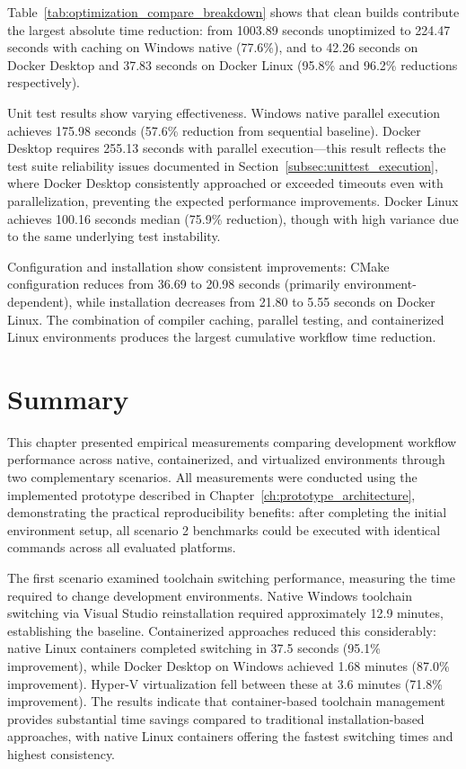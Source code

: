 Table~\ref{tab:optimization_compare_breakdown} shows that clean builds contribute the largest absolute time reduction: from 1003.89 seconds unoptimized to 224.47 seconds with caching on Windows native (77.6\%), and to 42.26 seconds on Docker Desktop and 37.83 seconds on Docker Linux (95.8\% and 96.2\% reductions respectively).

Unit test results show varying effectiveness.
Windows native parallel execution achieves 175.98 seconds (57.6\% reduction from sequential baseline).
Docker Desktop requires 255.13 seconds with parallel execution---this result reflects the test suite reliability issues documented in Section~\ref{subsec:unittest_execution}, where Docker Desktop consistently approached or exceeded timeouts even with parallelization, preventing the expected performance improvements.
Docker Linux achieves 100.16 seconds median (75.9\% reduction), though with high variance due to the same underlying test instability.

Configuration and installation show consistent improvements: CMake configuration reduces from 36.69 to 20.98 seconds (primarily environment-dependent), while installation decreases from 21.80 to 5.55 seconds on Docker Linux.
The combination of compiler caching, parallel testing, and containerized Linux environments produces the largest cumulative workflow time reduction.

\section{Summary}

This chapter presented empirical measurements comparing development workflow performance across native, containerized, and virtualized environments through two complementary scenarios.
All measurements were conducted using the implemented prototype described in Chapter~\ref{ch:prototype_architecture}, demonstrating the practical reproducibility benefits: after completing the initial environment setup, all scenario 2 benchmarks could be executed with identical commands across all evaluated platforms.

The first scenario examined toolchain switching performance, measuring the time required to change development environments.
Native Windows toolchain switching via Visual Studio reinstallation required approximately 12.9 minutes, establishing the baseline.
Containerized approaches reduced this considerably: native Linux containers completed switching in 37.5 seconds (95.1\% improvement), while Docker Desktop on Windows achieved 1.68 minutes (87.0\% improvement).
Hyper-V virtualization fell between these at 3.6 minutes (71.8\% improvement).
The results indicate that container-based toolchain management provides substantial time savings compared to traditional installation-based approaches, with native Linux containers offering the fastest switching times and highest consistency.

